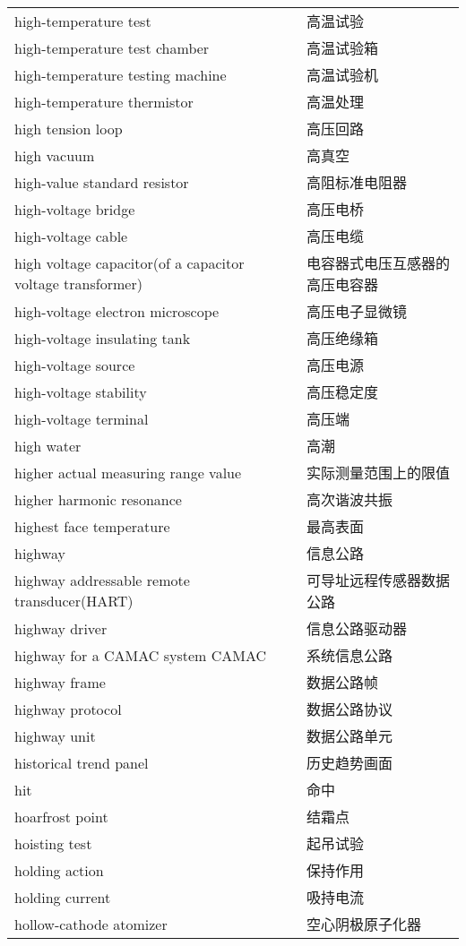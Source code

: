 \documentclass[
]{article}
\begin{document}
\begin{longtable}[]{@{}ll@{}}
high-temperature test & 高温试验 \\
high-temperature test chamber & 高温试验箱 \\
high-temperature testing machine & 高温试验机 \\
high-temperature thermistor & 高温处理 \\
high tension loop & 高压回路 \\
high vacuum & 高真空 \\
high-value standard resistor & 高阻标准电阻器 \\
high-voltage bridge & 高压电桥 \\
high-voltage cable & 高压电缆 \\
high voltage capacitor(of a capacitor voltage transformer) &
电容器式电压互感器的高压电容器 \\
high-voltage electron microscope & 高压电子显微镜 \\
high-voltage insulating tank & 高压绝缘箱 \\
high-voltage source & 高压电源 \\
high-voltage stability & 高压稳定度 \\
high-voltage terminal & 高压端 \\
high water & 高潮 \\
higher actual measuring range value & 实际测量范围上的限值 \\
higher harmonic resonance & 高次谐波共振 \\
highest face temperature & 最高表面 \\
highway & 信息公路 \\
highway addressable remote transducer(HART) &
可导址远程传感器数据公路 \\
highway driver & 信息公路驱动器 \\
highway for a CAMAC system CAMAC & 系统信息公路 \\
highway frame & 数据公路帧 \\
highway protocol & 数据公路协议 \\
highway unit & 数据公路单元 \\
historical trend panel & 历史趋势画面 \\
hit & 命中 \\
hoarfrost point & 结霜点 \\
hoisting test & 起吊试验 \\
holding action & 保持作用 \\
holding current & 吸持电流 \\
hollow-cathode atomizer & 空心阴极原子化器 \\

\end{longtable}
\end{document}

